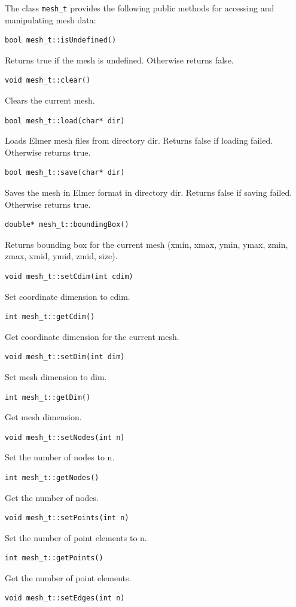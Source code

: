The class {\tt mesh\_t} provides the following public methods for accessing
and manipulating mesh data:
\begin{verbatim}
bool mesh_t::isUndefined()
\end{verbatim}
Returns true if the mesh is undefined. Otherwise returns false.
\begin{verbatim}
void mesh_t::clear()
\end{verbatim}
Clears the current mesh.
\begin{verbatim} 
bool mesh_t::load(char* dir)
\end{verbatim}
Loads Elmer mesh files from directory dir. Returns false if loading failed. Otherwise returns true.
\begin{verbatim} 
bool mesh_t::save(char* dir)
\end{verbatim}
Saves the mesh in Elmer format in directory dir. Returns false if saving failed. Otherwise returns true.
\begin{verbatim} 
double* mesh_t::boundingBox()
\end{verbatim}
Returns bounding box for the current mesh (xmin, xmax, ymin, ymax, zmin, zmax, xmid, ymid, zmid, size).
\begin{verbatim} 
void mesh_t::setCdim(int cdim)
\end{verbatim}
Set coordinate dimension to cdim.
\begin{verbatim}  
int mesh_t::getCdim()
\end{verbatim}
Get coordinate dimension for the current mesh.
\begin{verbatim}  
void mesh_t::setDim(int dim)
\end{verbatim}
Set mesh dimension to dim.
\begin{verbatim}
int mesh_t::getDim()
\end{verbatim}
Get mesh dimension.
\begin{verbatim}  
void mesh_t::setNodes(int n)
\end{verbatim}
Set the number of nodes to n.
\begin{verbatim} 
int mesh_t::getNodes()
\end{verbatim}
Get the number of nodes.
\begin{verbatim} 
void mesh_t::setPoints(int n)
\end{verbatim}
Set the number of point elements to n.
\begin{verbatim} 
int mesh_t::getPoints()
\end{verbatim}
Get the number of point elements.
\begin{verbatim} 
void mesh_t::setEdges(int n)
\end{verbatim}
